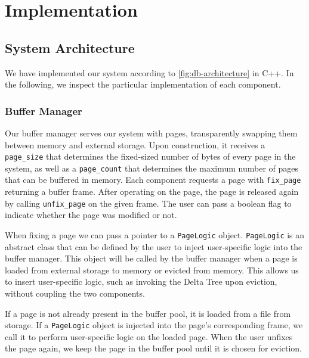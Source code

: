 \chapter{Implementation}



\section{System Architecture}

We have implemented our system according to \autoref{fig:db-architecture} in C++. 
In the following, we inspect the particular implementation of each component.

\subsection*{Buffer Manager}
Our buffer manager serves our system with pages, transparently swapping them between memory and external storage.
Upon construction, it receives a \texttt{page\_size} that determines the fixed-sized number of bytes of every page in the system, as well as a \texttt{page\_count} that determines the maximum number of pages that can be buffered in memory.
Each component requests a page with \texttt{fix\_page} returning a buffer frame. 
After operating on the page, the page is released again by calling \texttt{unfix\_page} on the given frame.
The user can pass a boolean flag to indicate whether the page was modified or not.

When fixing a page we can pass a pointer to a \texttt{PageLogic} object.
\texttt{PageLogic} is an abstract class that can be defined by the user to inject user-specific logic into the buffer manager.
This object will be called by the buffer manager when a page is loaded from external storage to memory or evicted from memory.
This allows us to insert user-specific logic, such as invoking the Delta Tree upon eviction, without coupling the two components.

If a page is not already present in the buffer pool, it is loaded from a file from storage. 
If a \texttt{PageLogic} object is injected into the page's corresponding frame, we call it to perform user-specific logic on the loaded page.
When the user unfixes the page again, we keep the page in the buffer pool until it is chosen for eviction.

